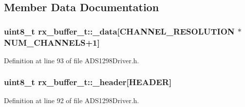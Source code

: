\subsection{\-Member \-Data \-Documentation}
\hypertarget{structrx__buffer__t_a89b7bd9eae7429781faee54444a2824c}{
\subsubsection[{\-\_\-data}]{\setlength{\rightskip}{0pt plus 5cm}uint8\-\_\-t {\bf rx\-\_\-buffer\-\_\-t\-::\-\_\-data}\mbox{[}{\bf \-C\-H\-A\-N\-N\-E\-L\-\_\-\-R\-E\-S\-O\-L\-U\-T\-I\-O\-N} $\ast${\bf \-N\-U\-M\-\_\-\-C\-H\-A\-N\-N\-E\-L\-S}+1\mbox{]}}}\label{structrx__buffer__t_a89b7bd9eae7429781faee54444a2824c}


\-Definition at line 93 of file \-A\-D\-S1298\-Driver.\-h.

\hypertarget{structrx__buffer__t_a779c76b344879924579b02bfd02de753}{
\subsubsection[{\-\_\-header}]{\setlength{\rightskip}{0pt plus 5cm}uint8\-\_\-t {\bf rx\-\_\-buffer\-\_\-t\-::\-\_\-header}\mbox{[}{\bf \-H\-E\-A\-D\-E\-R}\mbox{]}}}\label{structrx__buffer__t_a779c76b344879924579b02bfd02de753}


\-Definition at line 92 of file \-A\-D\-S1298\-Driver.\-h.

